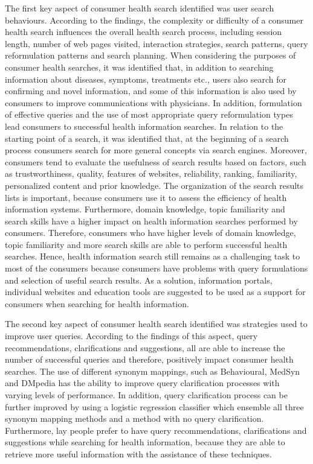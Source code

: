 \documentclass[]{article}
\begin{document}
The first key aspect of consumer health search identified was user search behaviours. According to the findings, the complexity or difficulty of a consumer health search influences the overall health search process, including session length, number of web pages visited, interaction strategies, search patterns, query reformulation patterns and search planning. When considering the purposes of consumer health searches, it was identified that, in addition to searching information about diseases, symptoms, treatments etc., users also search for confirming and novel information, and some of this information is also used by consumers to improve communications with physicians. In addition, formulation of effective queries and the use of most appropriate query reformulation types lead consumers to successful health information searches. In relation to the starting point of a search, it was identified that, at the beginning of a search process consumers search for more general concepts via search engines. Moreover, consumers tend to evaluate the usefulness of search results based on factors, such as trustworthiness, quality, features of websites, reliability, ranking, familiarity, personalized content and prior knowledge. The organization of the search results lists is important, because consumers use it to assess the efficiency of health information systems. Furthermore, domain knowledge, topic familiarity and search skills have a higher impact on health information searches performed by consumers. Therefore, consumers who have higher levels of domain knowledge, topic familiarity and more search skills are able to perform successful health searches. Hence, health information search still remains as a challenging task to most of the consumers because consumers have problems with query formulations and selection of useful search results. As a solution, information portals, individual websites and education tools are suggested to be used as a support for consumers when searching for health information. 

The second key aspect of consumer health search identified was strategies used to improve user queries. According to the findings of this aspect, query recommendations, clarifications and suggestions, all are able to increase the number of successful queries and therefore, positively impact consumer health searches. The use of different synonym mappings, such as Behavioural, MedSyn and DMpedia has the ability to improve query clarification processes with varying levels of performance. In addition, query clarification process can be further improved by using a logistic regression classifier which ensemble all three synonym mapping methods and a method with no query clarification. Furthermore, lay people prefer to have query recommendations, clarifications and suggestions while searching for health information, because they are able to retrieve more useful information with the assistance of these techniques. 
\end{document}
